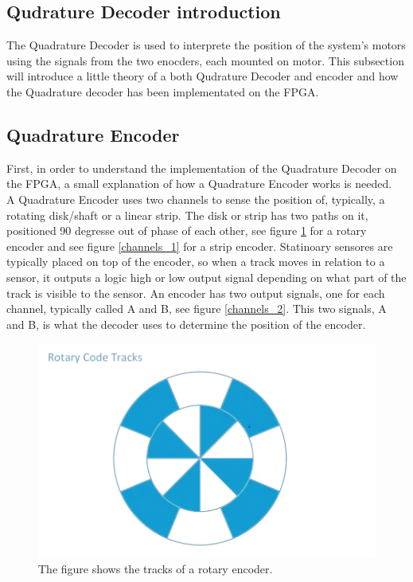 \documentclass[../../../main]{subfiles}
\begin{document}
\subsection*{Qudrature Decoder introduction}
The Quadrature Decoder is used to interprete the position of the system's motors using the signals from the two enocders, each  mounted on motor. This subsection will introduce a little theory of a both Qudrature Decoder and encoder and how the Quadrature decoder has been implementated on the FPGA.
\subsection*{Quadrature Encoder}
\label{sub:Theory}

First, in order to understand the implementation of the Quadrature Decoder on the FPGA, a small explanation of how a Quadrature Encoder works is needed. \\
A Quadrature Encoder uses two channels to sense the position of, typically, a rotating disk/shaft or a linear strip. The disk or strip has two paths on it, positioned 90 degresse out of phase of each other, see figure \ref{rotary_encoder} for a rotary encoder and see figure \ref{channels_1} for a strip encoder. Statinoary sensores are typically placed on top of the encoder, so when a track moves in relation to a sensor, it outputs a logic high or low output signal depending on what part of the track is visible to the sensor. An encoder has two output signals, one for each channel, typically called A and B, see figure \ref{channels_2}. This two signals, A and B, is what the decoder uses to determine the position of the encoder.

\begin{figure}[H]
  \includegraphics[width = \textwidth]{pictures/encoder.png}
  \caption{The figure shows the tracks of a rotary encoder.}
  \label{rotary_encoder}
\end{figure}
\end{document}
